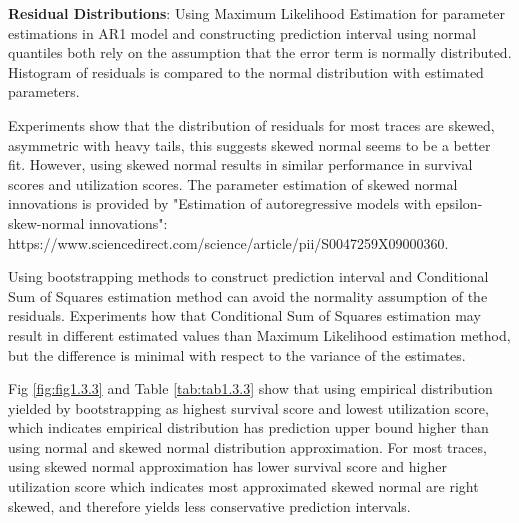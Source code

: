 \documentclass{article}
\begin{document}
\begin{flushleft}
\textbf{Residual Distributions}: Using Maximum Likelihood Estimation for parameter estimations in AR1 model and constructing prediction interval using normal quantiles both rely on the assumption that the error term is normally distributed. Histogram of residuals is compared to the normal distribution with estimated parameters.

Experiments show that the distribution of residuals for most traces are skewed, asymmetric with heavy tails, this suggests skewed normal seems to be a better fit. However, using skewed normal results in similar performance in survival scores and utilization scores. The parameter estimation of skewed normal innovations is provided by "Estimation of autoregressive models with epsilon-skew-normal innovations": https://www.sciencedirect.com/science/article/pii/S0047259X09000360.

Using bootstrapping methods to construct prediction interval and Conditional Sum of Squares estimation method can avoid the normality assumption of the residuals. Experiments how that Conditional Sum of Squares estimation may result in different estimated values than Maximum Likelihood estimation method, but the difference is minimal with respect to the variance of the estimates. 

Fig \ref{fig:fig1.3.3} and Table \ref{tab:tab1.3.3} show that using empirical distribution yielded by bootstrapping as highest survival score and lowest utilization score, which indicates empirical distribution has prediction upper bound higher than using normal and skewed normal distribution approximation. For most traces, using skewed normal approximation has lower survival score and higher utilization score which indicates most approximated skewed normal are right skewed, and therefore yields less conservative prediction intervals.
\end{flushleft}
\end{document}
